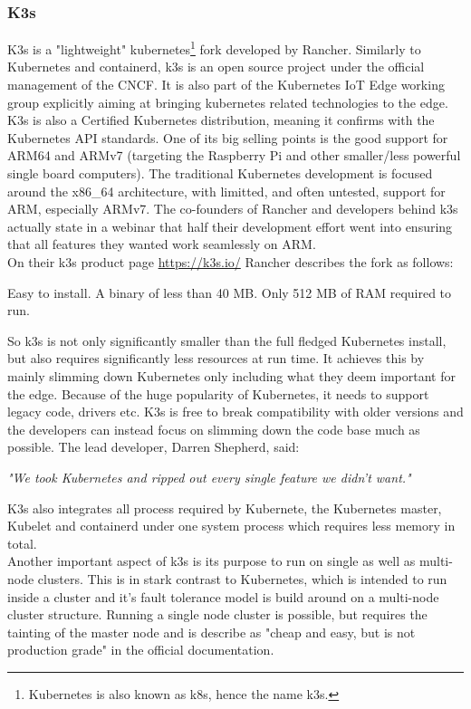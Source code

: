 \subsubsection{K3s}
K3s is a "lightweight" kubernetes\footnote{Kubernetes is also known as k8s, hence the name k3s.} fork developed by Rancher\cite{rancherMainPage:online}. Similarly to Kubernetes and containerd, k3s is an open source project under the official management of the CNCF. It is also part of the Kubernetes IoT Edge working group explicitly aiming at bringing kubernetes related technologies to the edge. K3s is also a Certified Kubernetes distribution, meaning it confirms with the Kubernetes API standards. One of its big selling points is the good support for ARM64 and ARMv7 (targeting the Raspberry Pi and other smaller/less powerful single board computers). The traditional Kubernetes development is focused around the x86\_64 architecture, with limitted, and often untested, support for ARM, especially ARMv7. The co-founders of Rancher and developers behind k3s actually state in a webinar that half their development effort went into ensuring that all features they wanted work seamlessly on ARM\cite{k3sTalk:online}.\\
On their k3s product page \url{https://k3s.io/} Rancher describes the fork as follows:
\begin{displayquote}
Easy to install. A binary of less than 40 MB. Only 512 MB of RAM required to run.
\end{displayquote}
So k3s is not only significantly smaller than the full fledged Kubernetes install, but also requires significantly less resources at run time. It achieves this by mainly slimming down Kubernetes only including what they deem important for the edge. Because of the huge popularity of Kubernetes, it needs to support legacy code, drivers etc. K3s is free to break compatibility with older versions and the developers can instead focus on slimming down the code base much as possible. The lead developer, Darren Shepherd, said:
\begin{displayquote}
\textit{"We took Kubernetes and ripped out every single feature we didn't want.\cite{k3sTalk:online}"}
\\[1pt]
\end{displayquote}
K3s also integrates all process required by Kubernete, the Kubernetes master, Kubelet and containerd under one system process which requires less memory in total. \\
Another important aspect of k3s is its purpose to run on single as well as multi-node clusters. This is in stark contrast to Kubernetes, which is intended to run inside a cluster and it's fault tolerance model is build around on a multi-node cluster structure. Running a single node cluster is possible, but requires the tainting of the master node and is describe as "cheap and easy, but is not production grade" in the official documentation\cite{singleNodeKubernetesNotProductionDocumenhtation:online}.

